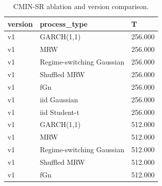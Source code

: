 \begin{table}[t]
\centering
\caption{CMIN-SR ablation and version comparison.}
\label{tab:table3_ablation}
\begin{tabular}{lll}
\toprule
version & process\_type & T \\
\midrule
v1 & GARCH(1,1) & 256.000 \\
v1 & MRW & 256.000 \\
v1 & Regime-switching Gaussian & 256.000 \\
v1 & Shuffled MRW & 256.000 \\
v1 & fGn & 256.000 \\
v1 & iid Gaussian & 256.000 \\
v1 & iid Student-t & 256.000 \\
v1 & GARCH(1,1) & 512.000 \\
v1 & MRW & 512.000 \\
v1 & Regime-switching Gaussian & 512.000 \\
v1 & Shuffled MRW & 512.000 \\
v1 & fGn & 512.000 \\
\bottomrule
\end{tabular}
\end{table}
